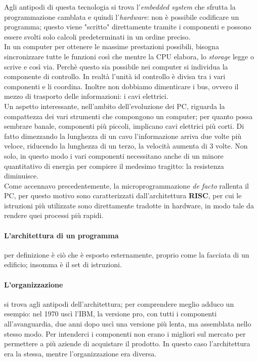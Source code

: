 \documentclass{article}
\begin{document}
 Agli antipodi di questa tecnologia si trova l'\textit{embedded system} che sfrutta la programmazione camblata e quindi l'\textit{hardware}: non è possibile codificare un programma; questo viene "scritto" direttamente tramite i componenti e possono essere svolti solo calcoli predeterminati in un ordine preciso.\\

In un computer per ottenere le massime prestazioni possibili, bisogna sincronizzare tutte le funzioni così che mentre la CPU elabora, lo \textit{storage} legge o scrive e così via.
Perchè questo sia possibile nei computer si individua la componente di controllo. In realtà l'unità id controllo è divisa tra i vari componenti e li coordina.
Inoltre non dobbiamo dimenticare i bus, ovvero il mezzo di trasporto delle informazioni: i cavi elettrici.\\
Un aspetto interessante, nell'ambito dell'evoluzione dei PC, riguarda la compattezza dei vari strumenti che compongono un computer; per quanto possa sembrare banale, componenti più piccoli, implicano cavi elettrici più corti. Di fatto dimezzando la lunghezza di un cavo l'informazione arriva due volte più veloce, riducendo la lunghezza di un terzo, la velocità aumenta di 3 volte. Non solo, in questo modo i vari componenti necessitano anche di un minore quantitativo di energia per compiere il medesimo tragitto: la resistenza diminuisce. \\

Come accennavo precedentemente, la microprogrammazione \textit{de facto} rallenta il PC, per questo motivo sono caratterizzati dall'architettura \textbf{RISC}, per cui le istruzioni più utilizzate sono direttamente tradotte in hardware, in modo tale da rendere quei processi più rapidi.

\paragraph{L'architettura di un programma} per definizione è ciò che è esposto esternamente, proprio come la facciata di un edificio; insomma è il set di istruzioni.
\paragraph{L'organizzazione} si trova agli antipodi dell'architettura; per comprendere meglio adduco un esempio: nel 1970 uscì l'IBM, la versione pro, con tutti i componenti all'avanguardia, due anni dopo uscì una versione più lenta, ma assemblata nello stesso modo. Per intenderci i componenti non erano i migliori sul mercato per permettere a più aziende di acquistare il prodotto. In questo caso l'architettura era la stessa, mentre l'organizzazione era diversa.\\
\end{document}
